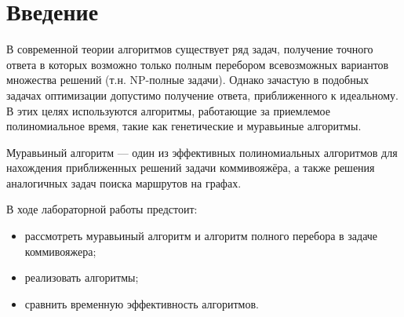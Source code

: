 \chapter*{Введение}


В современной теории алгоритмов существует ряд задач, получение точного ответа в которых возможно только полным перебором всевозможных вариантов множества решений (т.н. NP-полные задачи). Однако зачастую в подобных задачах оптимизации допустимо получение ответа, приближенного к идеальному. В этих целях используются алгоритмы, работающие за приемлемое полиномиальное время, такие как генетические и муравьиные алгоритмы.


Муравьиный алгоритм — один из эффективных полиномиальных алгоритмов для нахождения приближенных решений задачи коммивояжёра, а также решения аналогичных задач поиска маршрутов на графах.

В ходе лабораторной работы предстоит:

\begin{itemize}

	\item рассмотреть муравьиный алгоритм и алгоритм полного перебора в задаче коммивояжера;

	\item реализовать алгоритмы;

	\item сравнить временную эффективность алгоритмов.

\end{itemize}